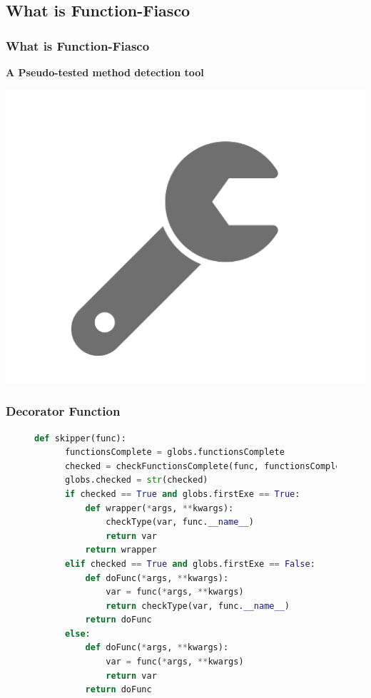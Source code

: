 \subsection{What is Function-Fiasco}
\begin{frame}
  \frametitle{What is Function-Fiasco}
    \begin{center}
      \huge{\textbf{A Pseudo-tested method detection tool}}

      \includegraphics[scale = .15]{images/wrench}
    \end{center}
\end{frame}

\begin{frame}[fragile]
  \frametitle{Decorator Function}
  \begin{figure}[t!, scale = .75]
	\begin{lstlisting}[language = Python, basicstyle=\tiny, backgroundcolor = \color{lightgray}]
  def skipper(func):
      functionsComplete = globs.functionsComplete
      checked = checkFunctionsComplete(func, functionsComplete)
      globs.checked = str(checked)
      if checked == True and globs.firstExe == True:
          def wrapper(*args, **kwargs):
              checkType(var, func.__name__)
              return var
          return wrapper
      elif checked == True and globs.firstExe == False:
          def doFunc(*args, **kwargs):
              var = func(*args, **kwargs)
              return checkType(var, func.__name__)
          return doFunc
      else:
          def doFunc(*args, **kwargs):
              var = func(*args, **kwargs)
              return var
          return doFunc
  \end{lstlisting}
\end{figure}
\end{frame}

